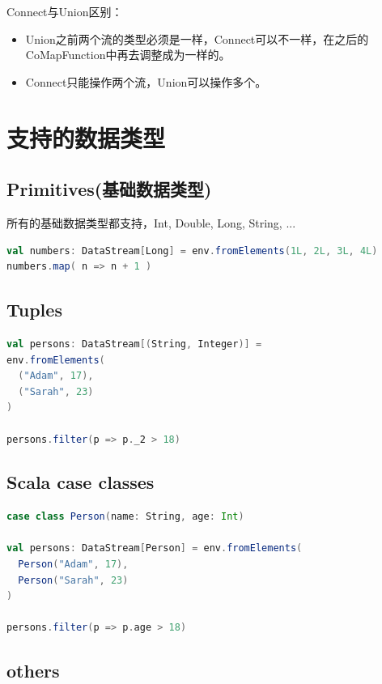 \documentclass[oneside]{ctexbook}
\begin{document}
Connect与Union区别：
\begin{itemize}
\item Union之前两个流的类型必须是一样，Connect可以不一样，在之后的CoMapFunction中再去调整成为一样的。
\item Connect只能操作两个流，Union可以操作多个。
\end{itemize}

\section{支持的数据类型}

\subsection{Primitives(基础数据类型)}

所有的基础数据类型都支持，Int, Double, Long, String, ...

\begin{lstlisting}[language=scala, breaklines]
val numbers: DataStream[Long] = env.fromElements(1L, 2L, 3L, 4L)
numbers.map( n => n + 1 )
\end{lstlisting}

\subsection{Tuples}

\begin{lstlisting}[language=scala, breaklines]
val persons: DataStream[(String, Integer)] =
env.fromElements(
  ("Adam", 17),
  ("Sarah", 23)
)

persons.filter(p => p._2 > 18)
\end{lstlisting}

\subsection{Scala case classes}

\begin{lstlisting}[language=scala, breaklines]
case class Person(name: String, age: Int)

val persons: DataStream[Person] = env.fromElements(
  Person("Adam", 17),
  Person("Sarah", 23)
)

persons.filter(p => p.age > 18)
\end{lstlisting}

\subsection{others}
\end{document}
